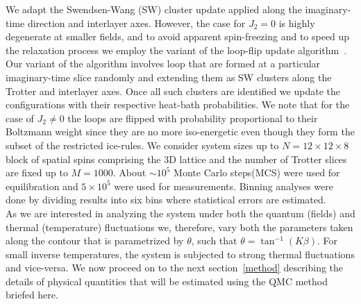 \indent We adapt the Swendsen-Wang (SW) \cite{swendsen1987nonuniversal} cluster update applied along the imaginary-time direction and interlayer axes. However, the case for $J_2=0$ is highly degenerate at smaller fields, and to avoid apparent spin-freezing and to speed up the relaxation process we employ the variant of the loop-flip update algorithm~\cite{Rahman}. Our variant of the algorithm involves loop that are formed at a particular imaginary-time slice randomly and extending them as SW clusters along the Trotter and interlayer axes. Once all such clusters are identified we update the configurations with their respective heat-bath probabilities. We note that for the case of $J_2\neq 0$ the loops are flipped with probability proportional to their Boltzmann weight since they are no more iso-energetic even though they form the subset of the restricted ice-rules. We consider system sizes up to $N=12\times12\times8$ block of spatial spins comprising the 3D lattice and the number of Trotter slices are fixed up to $M=1000$. About $\sim 10^5$ Monte Carlo steps(MCS) were used for equilibration and $5\times10^5$ were used for measurements. Binning analyses were done by dividing results into six bins where statistical errors are estimated. \\
\indent As we are interested in analyzing the system under both the quantum (fields) and thermal (temperature) fluctuations we, therefore, vary both the parameters taken along the contour that is parametrized by $\theta$, such that $\theta=\tan^{-1}(K\beta)$. For small inverse temperatures, the system is subjected to strong thermal fluctuations and vice-versa. We now proceed on to the next section~\ref{method} describing the details of physical quantities that will be estimated using the QMC method briefed here.
